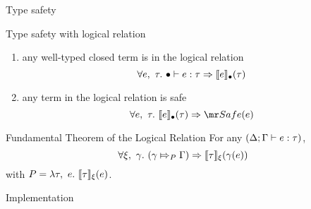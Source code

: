 \documentclass[xcolor={usenames,dvipsnames}]{beamer}
\newcommand\xxsectiontitle[1]{\begin{center}\Huge{#1}\end{center}}
\renewcommand\section[1]{\begin{frame}[noframenumbering]{}\xxsectiontitle{#1}\end{frame}}
\begin{document}
\begin{frame}{Type safety}
  \begin{block}{Type safety with logical relation}
    \begin{enumerate}
      \item any well-typed closed term is in the logical relation
            \[\forall e,\ \tau.\ \bullet \vdash e : \tau \Rightarrow \llbracket e \rrbracket_{\bullet}(\tau) \]
      \item  any term in the logical relation is safe
            \[\forall e,\ \ty.\ \lr{\empctx}{e}{\ty} \Rightarrow \safe(e) \]
   \end{enumerate}

  \end{block}

  \begin{block}{Fundamental Theorem of the Logical Relation}
    For any \((\Delta;\Gamma \vdash e : \tau)\),
    \[
      \forall \xi,\ \gamma.\ (\gamma \Mapsto_{P} \Gamma) \Rightarrow \llbracket \tau \rrbracket_{\xi}(\gamma(e))
    \]
    with $P = \lambda \tau,~e.~ \llbracket \tau \rrbracket_{\xi}(e)$.
  \end{block}
\end{frame}

\section{Implementation}%


\end{document}
